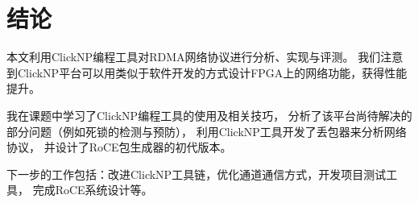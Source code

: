 \chapter{结论}
本文利用ClickNP编程工具对RDMA网络协议进行分析、实现与评测。
我们注意到ClickNP平台可以用类似于软件开发的方式设计FPGA上的网络功能，获得性能提升。

我在课题中学习了ClickNP编程工具的使用及相关技巧，
分析了该平台尚待解决的部分问题（例如死锁的检测与预防），
利用ClickNP工具开发了丢包器来分析网络协议，
并设计了RoCE包生成器的初代版本。

下一步的工作包括：改进ClickNP工具链，优化通道通信方式，开发项目测试工具，
完成RoCE系统设计等。
